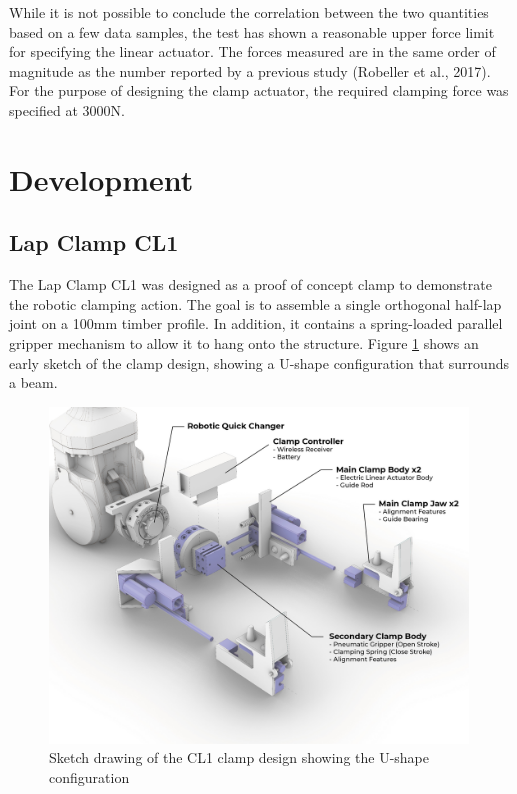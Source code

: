 While it is not possible to conclude the correlation between the two quantities based on a few data samples, the test has shown a reasonable upper force limit for specifying the linear actuator. The forces measured are in the same order of magnitude as the number reported by a previous study (Robeller et al., 2017). For the purpose of designing the clamp actuator, the required clamping force was specified at 3000N.

\section{Development}
\label{section:exploration-1-development}

\subsection{Lap Clamp CL1}
\label{subsection:exploration-1-lap-clamp-cl1-proof-of-concept}

The Lap Clamp CL1 was designed as a proof of concept clamp to demonstrate the robotic clamping action. The goal is to assemble a single orthogonal half-lap joint on a 100mm timber profile.
In addition, it contains a spring-loaded parallel gripper mechanism to allow it to hang onto the structure. Figure \ref{fig:cl1-sketch} shows an early sketch of the clamp design, showing a U-shape configuration that surrounds a beam.

\begin{figure}
    \centering
    \includegraphics[width=0.99\textwidth]{images/04-3/cl1-exploded-diagram.jpg}
    \caption{Sketch drawing of the CL1 clamp design showing the U-shape configuration}
    \label{fig:cl1-sketch}
\end{figure}

